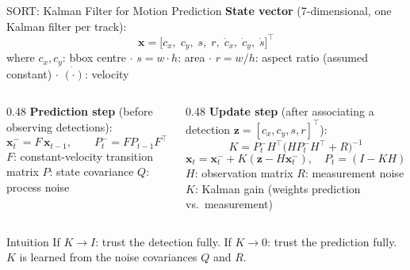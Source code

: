 \documentclass[aspectratio=169]{beamer}
\begin{document}
\begin{frame}{SORT: Kalman Filter for Motion Prediction}
  \textbf{State vector} (7-dimensional, one Kalman filter per track):
  \[
    \mathbf{x} = \bigl[c_x,\; c_y,\; s,\; r,\; \dot{c}_x,\; \dot{c}_y,\; \dot{s}\bigr]^\top
  \]
  where $c_x, c_y$: bbox centre $\cdot$ $s = w \cdot h$: area $\cdot$
  $r = w/h$: aspect ratio (assumed constant) $\cdot$ $\dot{(\cdot)}$: velocity

  \begin{columns}[T]
    \begin{column}{0.48\textwidth}
      \textbf{Prediction step} (before observing detections):
      \[
        \mathbf{x}^-_t = F\,\mathbf{x}_{t-1}, \qquad
        P^-_t = F P_{t-1} F^\top + Q
      \]
      $F$: constant-velocity transition matrix \quad
      $P$: state covariance \quad $Q$: process noise
    \end{column}
    \begin{column}{0.48\textwidth}
      \textbf{Update step} (after associating a detection $\mathbf{z}=[c_x,c_y,s,r]^\top$):
      \[
        K = P^-_t H^\top\!\bigl(H P^-_t H^\top + R\bigr)^{-1}
      \]
      \[
        \mathbf{x}_t = \mathbf{x}^-_t + K\!\left(\mathbf{z} - H\mathbf{x}^-_t\right),
        \quad P_t = (I - KH)\,P^-_t
      \]
      $H$: observation matrix \quad $R$: measurement noise \quad
      $K$: Kalman gain (weights prediction vs.\ measurement)
    \end{column}
  \end{columns}
  \vspace{0.2em}
  \begin{block}{Intuition}
    \small If $K \to I$: trust the detection fully.
    If $K \to 0$: trust the prediction fully.
    $K$ is learned from the noise covariances $Q$ and $R$.
  \end{block}
\end{frame}
\end{document}
